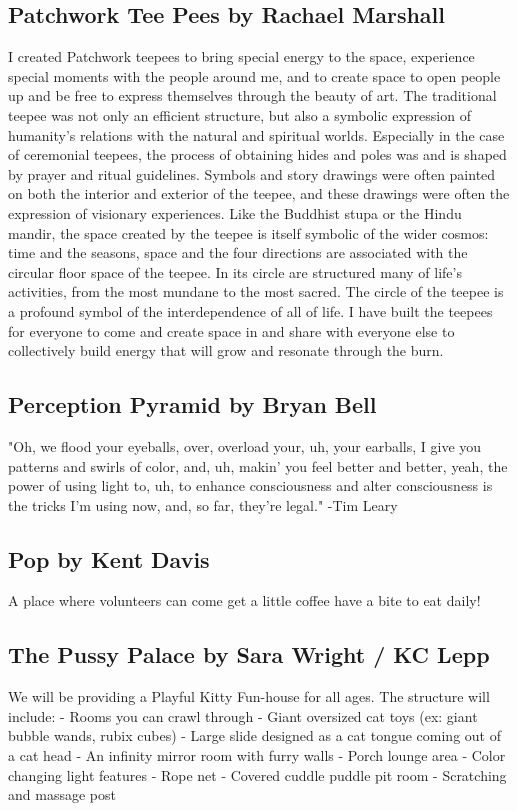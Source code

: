 \begin{multicols}{2}
\subsection*{Patchwork Tee Pees by Rachael Marshall                 }
I created Patchwork teepees to bring special energy to the space, experience special moments with the people around me, and to create space to open people up and be free to express themselves through the beauty of art. The traditional teepee was not only an efficient structure, but also a symbolic expression of humanity’s relations with the natural and spiritual worlds. Especially in the case of ceremonial teepees, the process of obtaining hides and poles was and is shaped by prayer and ritual guidelines. Symbols and story drawings were often painted on both the interior and exterior of the teepee, and these drawings were often the expression of visionary experiences. Like the Buddhist stupa or the Hindu mandir, the space created by the teepee is itself symbolic of the wider cosmos: time and the seasons, space and the four directions are associated with the circular floor space of the teepee. In its circle are structured many of life’s activities, from the most mundane to the most sacred. The circle of the teepee is a profound symbol of the interdependence of all of life. I have built the teepees for everyone to come and create space in and share with everyone else to collectively build energy that will grow and resonate through the burn.


\subsection*{Perception Pyramid        by Bryan Bell        }
"Oh, we flood your eyeballs, over, overload your, uh, your earballs, I give you patterns and swirls of color, and, uh, makin’ you feel better and better, yeah, the power of using light to, uh, to enhance consciousness and alter consciousness is the tricks I’m using now, and, so far, they’re legal." -Tim Leary                




\subsection*{Pop        by Kent Davis   }
        A place where volunteers can come get a little coffee have a bite to eat daily!         


\subsection*{The Pussy Palace        by Sara Wright / KC Lepp        }
We will be providing a Playful Kitty Fun-house for all ages. The structure will include:
- Rooms you can crawl through
- Giant oversized cat toys (ex: giant bubble wands, rubix cubes)
- Large slide designed as a cat tongue coming out of a cat head
- An infinity mirror room with furry walls
- Porch lounge area
- Color changing light features
- Rope net
- Covered cuddle puddle pit room
- Scratching and massage post





\end{multicols}

